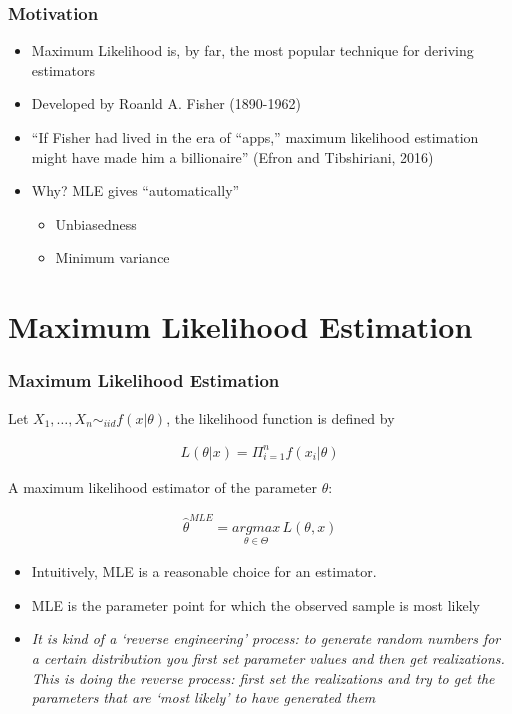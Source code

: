\documentclass[
  shownotes,
  xcolor={svgnames},
  hyperref={colorlinks,citecolor=DarkBlue,linkcolor=DarkRed,urlcolor=DarkBlue}
  ]{beamer}
\begin{document}
\begin{frame}[fragile]
\frametitle{Motivation}

\begin{itemize}
    \item Maximum Likelihood is, by far, the most popular technique for deriving estimators
    \bigskip 
    \item Developed by Roanld A. Fisher (1890-1962)
    \bigskip
    \item ``If Fisher had lived in the era of “apps,” maximum likelihood estimation might have made him a billionaire'' (Efron and Tibshiriani, 2016)
    \bigskip
    \item  Why? MLE gives ``automatically''
    \begin{itemize}
      \item Unbiasedness 
      \medskip
      \item Minimum variance
    \end{itemize} 
\end{itemize}
 


 \end{frame}
\section{Maximum Likelihood Estimation}
\begin{frame}[fragile]
\frametitle{Maximum Likelihood Estimation}

Let $X_1,\dots,X_n\sim_{iid}f(x|\theta)$, the likelihood function is defined by

\begin{align}\label{eq:1}
L(\theta|x)=\Pi_{i=1}^n f(x_i|\theta)
\end{align}

A maximum likelihood estimator of the parameter $\theta$:

\begin{align}
\hat \theta^{MLE}=\underset{\theta \in \Theta}{argmax}\, L(\theta,x)
\end{align}

\begin{itemize}
  \item Intuitively, MLE is a reasonable choice for an estimator.
  \item MLE is the parameter point for which the observed sample is most likely
  \item {\it It is kind of a ‘reverse engineering’ process:  to generate random numbers for a certain distribution you first set parameter values and then get realizations. This is doing the reverse process:  first set the realizations and try to get the parameters that are ‘most likely’ to have generated them}
\end{itemize}


 \end{frame}
\end{document}
